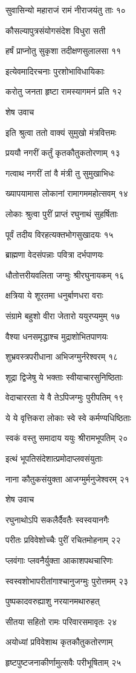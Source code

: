 सुवासिन्यो महाराजं रामं नीराजयंतु ताः १०

कौसल्यापुत्रसंयोगसंदेश विधुरा सती

हर्षं प्राप्नोतु सुकृशा तदीक्षणसुलालसा ११

इत्येवमादिरचनाः पुरशोभाविधायिकाः

करोतु जनता हृष्टा रामस्यागमनं प्रति १२

शेष उवाच

इति श्रुत्वा ततो वाक्यं सुमुखो मंत्रवित्तमः

प्रययौ नगरीं कर्तुं कृतकौतुकतोरणाम् १३

गत्वाथ नगरीं तां वै मंत्री तु सुमुखाभिधः

ख्यापयामास लोकानां रामागममहोत्सवम् १४

लोकाः श्रुत्वा पुरीं प्राप्तं रघुनाथं सुहर्षिताः

पूर्वं तदीय विरहत्यक्तभोगसुखादयः १५

ब्राह्मणा वेदसंपन्नाः पवित्रा दर्भपाणयः

धौतोत्तरीयवलिता जग्मुः श्रीरघुनायकम् १६

क्षत्रिया ये शूरतमा धनुर्बाणधरा वराः

संग्रामे बहुशो वीरा जेतारो ययुरप्यमुम् १७

वैश्या धनसमृद्धाश्च मुद्राशोभितपाणयः

शुभ्रवस्त्रपरीधाना अभिजग्मुर्नरेश्वरम् १८

शूद्रा द्विजेषु ये भक्ताः स्वीयाचारसुनिष्ठिताः

वेदाचाररता ये वै तेऽपिजग्मुः पुरीपतिम् १९

ये ये वृत्तिकरा लोकाः स्वे स्वे कर्मण्यधिष्ठिताः

स्वकं वस्तु समादाय ययुः श्रीरामभूपतिम् २०

इत्थं भूपतिसंदेशात्प्रमोदाप्लवसंयुताः

नाना कौतुकसंयुक्ता आजग्मुर्मनुजेश्वरम् २१

शेष उवाच

रघुनाथोऽपि सकलैर्दैवतैः स्वस्वयानगैः

परीतः प्रविवेशोच्चैः पुरीं रचितमोहनाम् २२

प्लवंगाः प्लवनैर्युक्ता आकाशपथचारिणः

स्वस्वशोभापरीतांगाश्चानुजग्मुः पुरोत्तमम् २३

पुष्पकादवरुह्याशु नरयानमथारुहत्

सीतया सहितो रामः परिवारसमावृतः २४

अयोध्यां प्रविवेशाथ कृतकौतुकतोरणाम्

हृष्टपुष्टजनाकीर्णामुत्सवैः परीभूषिताम् २५

